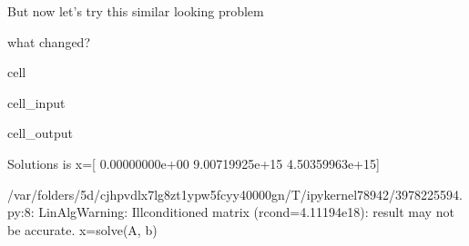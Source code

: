 \documentclass[letterpaper,10pt,english]{jupyterBook}
\begin{document}
\sphinxAtStartPar
But now let’s try this similar looking problem

\sphinxAtStartPar
{} what changed?

\begin{sphinxuseclass}{cell}\begin{sphinxVerbatimInput}

\begin{sphinxuseclass}{cell_input}
\begin{sphinxVerbatim}[commandchars=\\\{\}]
   
   
  \PYG{p}{[}\PYG{p}{[}  \PYG{p}{]}
     \PYG{p}{[}  \PYG{p}{]}
     \PYG{p}{[}  \PYG{p}{]}\PYG{p}{]}
    
    
 
\end{sphinxVerbatim}

\end{sphinxuseclass}\end{sphinxVerbatimInput}
\begin{sphinxVerbatimOutput}

\begin{sphinxuseclass}{cell_output}
\begin{sphinxVerbatim}[commandchars=\\\{\}]
Solutions is x=[ 0.00000000e+00 \PYGZhy{}9.00719925e+15  4.50359963e+15]
\end{sphinxVerbatim}

\begin{sphinxVerbatim}[commandchars=\\\{\}]
/var/folders/5d/cjhpvdlx7lg8zt1ypw5fcyy40000gn/T/ipykernel\PYGZus{}78942/3978225594.py:8: LinAlgWarning: Ill\PYGZhy{}conditioned matrix (rcond=4.11194e\PYGZhy{}18): result may not be accurate.
  x=solve(A, b)
\end{sphinxVerbatim}

\end{sphinxuseclass}\end{sphinxVerbatimOutput}

\end{sphinxuseclass}
\end{document}
